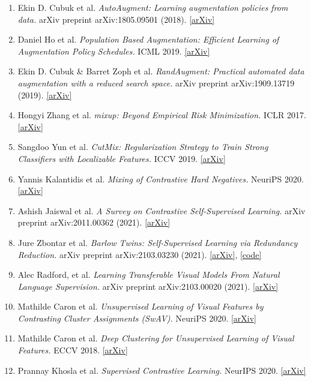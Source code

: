 \documentclass[12pt]{article}
\begin{document}
\begin{enumerate}
    \item Ekin D. Cubuk et al. \textit{AutoAugment: Learning augmentation policies from data.} arXiv preprint arXiv:1805.09501 (2018). \href{https://arxiv.org/abs/1805.09501}{[arXiv]}
    \item Daniel Ho et al. \textit{Population Based Augmentation: Efficient Learning of Augmentation Policy Schedules.} ICML 2019. \href{https://arxiv.org/abs/1905.05393}{[arXiv]}
    \item Ekin D. Cubuk \& Barret Zoph et al. \textit{RandAugment: Practical automated data augmentation with a reduced search space.} arXiv preprint arXiv:1909.13719 (2019). \href{https://arxiv.org/abs/1909.13719}{[arXiv]}
    \item Hongyi Zhang et al. \textit{mixup: Beyond Empirical Risk Minimization.} ICLR 2017. \href{https://arxiv.org/abs/1710.09412}{[arXiv]}
    \item Sangdoo Yun et al. \textit{CutMix: Regularization Strategy to Train Strong Classifiers with Localizable Features.} ICCV 2019. \href{https://arxiv.org/abs/1905.04899}{[arXiv]}
    \item Yannis Kalantidis et al. \textit{Mixing of Contrastive Hard Negatives.} NeuriPS 2020. \href{https://arxiv.org/abs/2010.01028}{[arXiv]}
    \item Ashish Jaiswal et al. \textit{A Survey on Contrastive Self-Supervised Learning.} arXiv preprint arXiv:2011.00362 (2021). \href{https://arxiv.org/abs/2011.00362}{[arXiv]}
    \item Jure Zbontar et al. \textit{Barlow Twins: Self-Supervised Learning via Redundancy Reduction.} arXiv preprint arXiv:2103.03230 (2021). \href{https://arxiv.org/abs/2103.03230}{[arXiv]}, \href{https://github.com/facebookresearch/barlowtwins}{[code]}
    \item Alec Radford, et al. \textit{Learning Transferable Visual Models From Natural Language Supervision.} arXiv preprint arXiv:2103.00020 (2021). \href{https://arxiv.org/abs/2103.00020}{[arXiv]}
    \item Mathilde Caron et al. \textit{Unsupervised Learning of Visual Features by Contrasting Cluster Assignments (SwAV).} NeuriPS 2020. \href{https://arxiv.org/abs/2006.09882}{[arXiv]}
    \item Mathilde Caron et al. \textit{Deep Clustering for Unsupervised Learning of Visual Features.} ECCV 2018. \href{https://arxiv.org/abs/1807.05520}{[arXiv]}
    \item Prannay Khosla et al. \textit{Supervised Contrastive Learning.} NeurIPS 2020. \href{https://arxiv.org/abs/2004.11362}{[arXiv]}

\end{enumerate}
\end{document}
